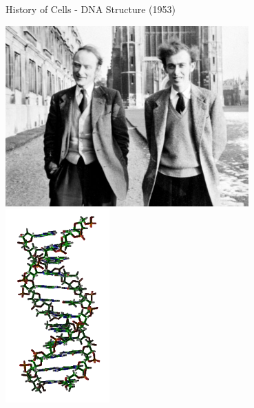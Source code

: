 \begin{frame}{History of Cells - DNA Structure (1953)}
\footnotesize
\begin{center}
\includegraphics[width=0.7\textwidth]{./images/portrait-wcwalking-600w.jpg} 
\includegraphics[width=0.3\textwidth]{./images/DNA_orbit_animated_static_thumb2.png} 
\end{center}
\end{frame}

